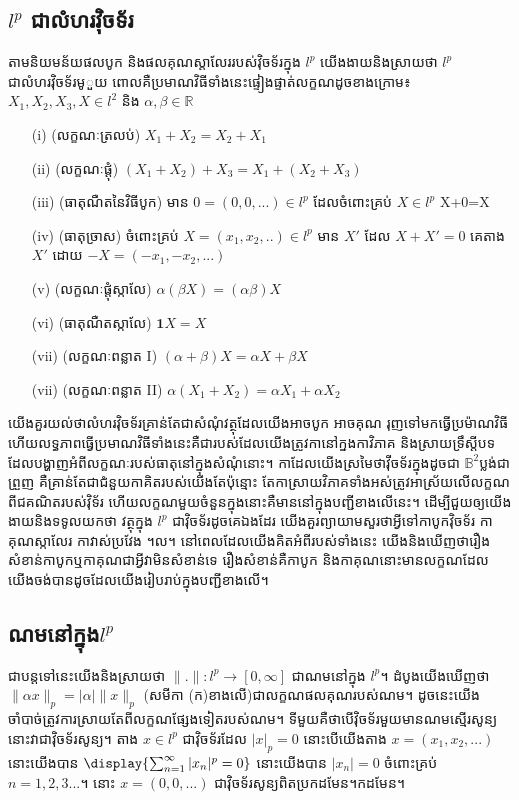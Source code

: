 \documentclass[12pt]{article}
\theoremstyle{definition}
\begin{document}
{\subsection{ $l^p$ ជាលំហរវុិចទ័រ }
តាមនិយមន័យផលបូក និងផលគុណស្តាលែររបស់វុិចទ័រក្នុង $l^p$ យើងងាយនិងស្រាយថា $l^p$ ជាលំហរវុិចទ័រមូួយ ពោលគឺប្រមាណវិធីទាំងនេះផ្ទៀងផ្ទាត់លក្ខណដូចខាងក្រោម៖ 
$X_1,X_2,X_3,X\in l^2$ និង $\alpha,\beta\in \mathbb{R}$ 
\begin{itemize}
        \item [(i)] (លក្ខណៈត្រលប់) $X_1+X_2=X_2+X_1$
        \item [(ii)] (លក្ខណៈផ្តំុ)
        $(X_1+X_2)+X_3=X_1+(X_2+X_3)$
        \item [(iii)] (ធាតុណឺតនៃវិធីបូក) មាន $0=(0,0,...)\in l^p$ ដែលចំពោះគ្រប់ 
        $X\in l^p$
        X+0=X
        \item [(iv)] (ធាតុច្រាស) ចំពោះគ្រប់ $X=(x_1,x_2,..)\in l^p$ មាន $X'$ ដែល
        $X+X'=0$
        គេតាង $X'$ ដោយ $-X=(-x_1,-x_2,...)$
        \item [(v)] (លក្ខណៈផ្តុំស្កាលែ) $\alpha(\beta X)=(\alpha \beta)X$
        \item [(vi)] (ធាតុណឺតស្កាលែ) $\mathbf{1}X=X$
        \item [(vii)] (លក្ខណៈពន្លាត I) $(\alpha+\beta )X=\alpha X+\beta X$ 
        \item [(vii)] (លក្ខណៈពន្លាត II) $\alpha(X_1+X_2)=\alpha X_1+\alpha X_2$ 
    \end{itemize} 
    
    យើងគួរយល់ថាលំហរវុិចទ័រគ្រាន់តែជាសំណុំវត្ថុដែលយើងអាចបូក អាចគុណ រុញទៅមកធ្វើប្រម៉ាណវិធី ហើយលទ្ធភាពធ្វើប្រមាណវិធីទាំងនេះគឺជារបស់ដែលយើងត្រូវកានៅក្នងកាវិភាគ និងស្រាយទ្រឹស្តីបទដែលបង្ហាញអំពីលក្ខណៈរបស់ធាតុនៅក្នុងសំណុំនោះ។ កាដែលយើងស្រមៃថាវុីចទ័រក្នុងដូចជា ${\mathbb{B}}^2 $ប្លង់ជាព្រួញ គឺគ្រាន់តែជាជំនួយកាគិតរបស់យើងតែប៉ុន្មោះ តែកាស្រាយវិភាគទាំងអស់ត្រូវអាស្រ័យលើលក្ខណពីជគណិតរបស់វុិទ័រ ហើយលក្ខណមួយចំនួនក្នុងនោះគឺមាននៅក្នុងបញ្ជីខាងលើនេះ។ ដើម្បីជួយឲ្យយើងងាយនិងទទូលយកថា វត្ថុក្នុង
$l^p$ ជាវុិចទ័រដូចគេឯងដែរ យើងគួរព្យាយាមសួរថាអ្វីទៅកាបូកវុិចទ័រ កាគុណស្កាលែរ កាវាស់ប្រវែង ។ល។ នៅពេលដែលយើងគិតអំពីរបស់ទាំងនេះ យើងនិងឃើញថារឿងសំខាន់កាបូកឬកាគុណជាអ្វីវាមិនសំខាន់ទេ រឿងសំខាន់គឺកាបូក និងកាគុណនោះមានលក្ខណដែលយើងចង់បានដូចដែលយើងរៀបរាប់ក្នុងបញ្ជីខាងលើ។
    \subsection {ណមនៅក្នុង$ l^p$}
    
ជាបន្តទៅនេះយើងនិងស្រាយថា $\|.\|: l^p \to [0,\infty ]$ ជាណមនៅក្នុង  $l^p$។  ដំបូងយើងឃើញថា $\|\alpha x\|_p=|\alpha| \|x\|_p$ (សមីកា (ក)ខាងលើ)ជាលក្ខណផលគុណរបស់ណម។ ដូចនេះយើងចាំបាច់ត្រូវការស្រាយតែពីលក្ខណផ្សែងទៀតរបស់ណម។ 
ទីមួយគឺថាបើវុិចទ័រមួយមានណមស្មើរសូន្យនោះវាជាវុិចទ័រសូន្យ។ តាង $x\in l^p$ ជាវុិចទ័រដែល $|x|_p=0$ នោះបើយើងតាង $x=(x_1,x_2,...)$ នោះយើងបាន $\display{\sum_{n=1}^{\infty}{|x_n|^p =0}}$ នោះយើងបាន $|x_n|=0$ ចំពោះគ្រប់ $n=1,2,3...$។ នោះ $x=(0,0,...)$ ជាវុិចទ័រសូន្យពិតប្រកដមែន។កដមែន។

}
\end{document}
